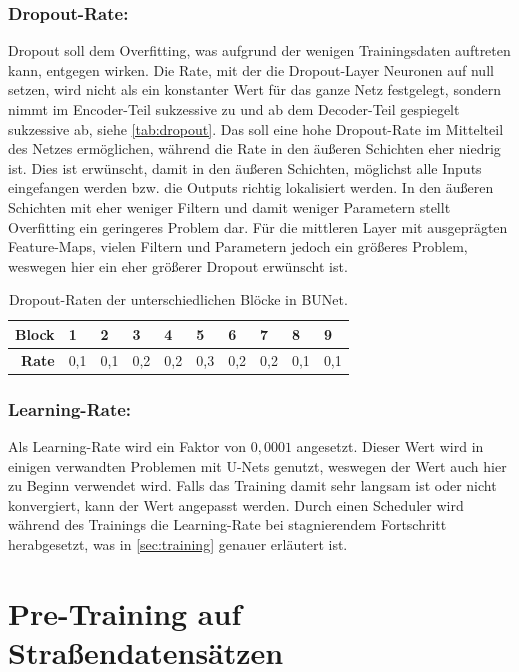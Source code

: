 \subsubsection{Dropout-Rate:} \label{sec:hyperparameter:dropout}

Dropout soll dem Overfitting, was aufgrund der wenigen Trainingsdaten auftreten kann, entgegen wirken. 
Die Rate, mit der die Dropout-Layer Neuronen auf null setzen, wird nicht als ein konstanter Wert für das ganze Netz festgelegt, 
sondern nimmt im Encoder-Teil sukzessive zu und ab dem Decoder-Teil gespiegelt sukzessive ab, siehe \autoref{tab:dropout}. 
Das soll eine hohe Dropout-Rate im Mittelteil des Netzes ermöglichen, während die Rate in den äußeren Schichten eher niedrig ist. 
Dies ist erwünscht, damit in den äußeren Schichten, möglichst alle Inputs eingefangen werden bzw. die Outputs richtig lokalisiert werden. 
In den äußeren Schichten mit eher weniger Filtern und damit weniger Parametern stellt Overfitting ein geringeres Problem dar. 
Für die mittleren Layer mit ausgeprägten Feature-Maps, vielen Filtern und Parametern jedoch ein größeres Problem, weswegen hier ein eher größerer
Dropout erwünscht ist.     

\begin{table}[ht]
	\centering
	\begin{tabular}{r|ll|ll|l|ll|ll}
		\textbf{Block} & 1 & 2 & 3 & 4 & 5  & 6 & 7 & 8 & 9 \\
		\midrule
		\textbf{Rate} & 0,1 & 0,1 & 0,2 & 0,2 & 0,3 & 0,2 & 0,2 & 0,1 & 0,1 \\ 
	\end{tabular}
	\caption{Dropout-Raten der unterschiedlichen Blöcke in \ac{BUNet}.}
	\label{tab:dropout}
\end{table}

\subsubsection{Learning-Rate:}

Als Learning-Rate wird ein Faktor von $0,0001$ angesetzt. Dieser Wert wird in einigen verwandten Problemen mit U-Nets genutzt, 
weswegen der Wert auch hier zu Beginn verwendet wird. Falls das Training damit sehr langsam ist oder nicht konvergiert, 
kann der Wert angepasst werden. Durch einen Scheduler wird während des Trainings die Learning-Rate bei stagnierendem Fortschritt 
herabgesetzt, was in \autoref{sec:training} genauer erläutert ist. 

\section{Pre-Training auf Straßendatensätzen} \label{sec:pre-training-roads}

